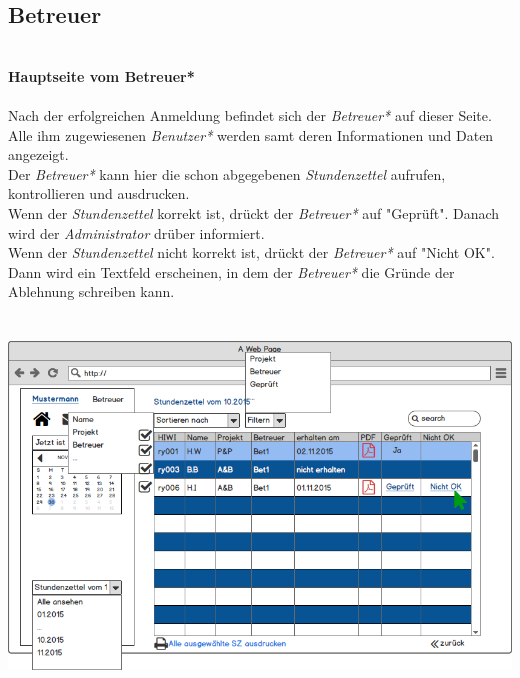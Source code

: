 \subsection{Betreuer}
\textbf{\\Hauptseite vom Betreuer*}\\
\\
Nach der erfolgreichen Anmeldung befindet sich der \emph{Betreuer*} auf dieser Seite.\\
Alle ihm zugewiesenen \emph{Benutzer*} werden samt deren Informationen und Daten angezeigt.\\
Der \emph{Betreuer*} kann hier die schon abgegebenen \emph{Stundenzettel} aufrufen, kontrollieren und ausdrucken.\\
Wenn der \emph{Stundenzettel} korrekt ist, drückt der \emph{Betreuer*} auf "Geprüft". Danach wird der \emph{Administrator} drüber informiert.\\
Wenn der \emph{Stundenzettel} nicht korrekt ist, drückt der \emph{Betreuer*} auf "Nicht OK". Dann wird ein Textfeld erscheinen, in dem der \emph{Betreuer*} die Gründe der Ablehnung schreiben kann.\\
\\
\\
\includegraphics[width=\linewidth]{UI/Betreuer/Hauptseite.png}

